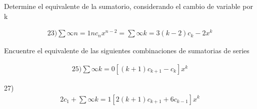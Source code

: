 \documentclass{article}
\begin{document}
Determine el equivalente de la sumatorio, considerando el cambio de variable por k


\begin{gather*}
23)   \sum{∞}{n=1}nc_{n}x^{n-2} =\sum{∞}{k=3}(k-2)c_{k}-2x^{k}
\end{gather*}




Encuentre el equivalente de las siguientes combinaciones de sumatorias de series


\begin{gather*}
25) \sum{∞}{k=0}[(k+1)c_{k+1}-c_{k}]x^{k}
\end{gather*}


27) 
\begin{gather*}
2c_{1}+\sum{∞}{k=1}[2(k+1)c_{k+1}+6c_{k-1}]x^{k}
\end{gather*}
\end{document}
